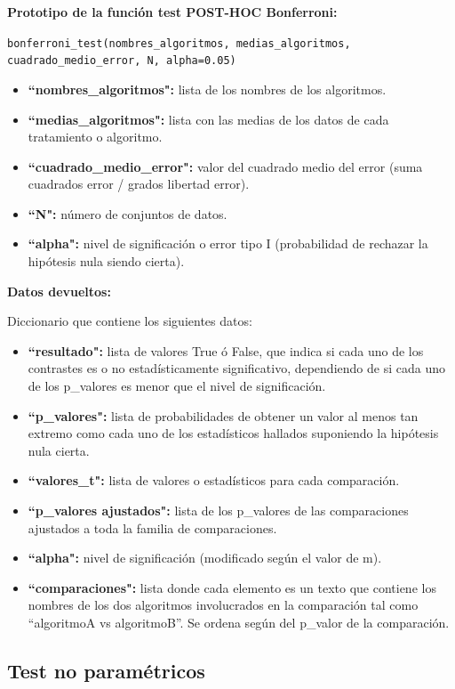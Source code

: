 \noindent
\textbf{Prototipo de la función test POST-HOC Bonferroni:}

\texttt{bonferroni\_test(nombres\_algoritmos, medias\_algoritmos, cuadrado\_medio\_error, N, alpha=0.05)}

\begin{itemize}
\item \textbf{``nombres\_algoritmos":} lista de los nombres de los algoritmos.
\item \textbf{``medias\_algoritmos":} lista con las medias de los datos de cada tratamiento o algoritmo.
\item \textbf{``cuadrado\_medio\_error":} valor del cuadrado medio del error (suma cuadrados error / grados libertad error).
\item \textbf{``N":} número de conjuntos de datos.
\item \textbf{``alpha":} nivel de significación o error tipo I (probabilidad de rechazar la hipótesis nula siendo cierta).
\end{itemize}

\noindent
\textbf{Datos devueltos:}

Diccionario que contiene los siguientes datos:

\begin{itemize}
\item \textbf{``resultado":} lista de valores True ó False, que indica si cada uno de los contrastes es o no estadísticamente significativo, dependiendo de si cada uno de los p\_valores es menor que el nivel de significación.
\item \textbf{``p\_valores":} lista de probabilidades de obtener un valor al menos tan extremo como cada uno de los estadísticos hallados suponiendo la hipótesis nula cierta.
\item \textbf{``valores\_t":} lista de valores o estadísticos para cada comparación.
\item \textbf{``p\_valores ajustados":} lista de los p\_valores de las comparaciones ajustados a toda la familia de comparaciones.
\item \textbf{``alpha":} nivel de significación (modificado según el valor de m).
\item \textbf{``comparaciones":} lista donde cada elemento es un texto que contiene los nombres de los dos algoritmos involucrados en la comparación tal como “algoritmoA vs algoritmoB”. Se ordena según del p\_valor de la comparación.
\end{itemize}

\subsection{Test no paramétricos}

